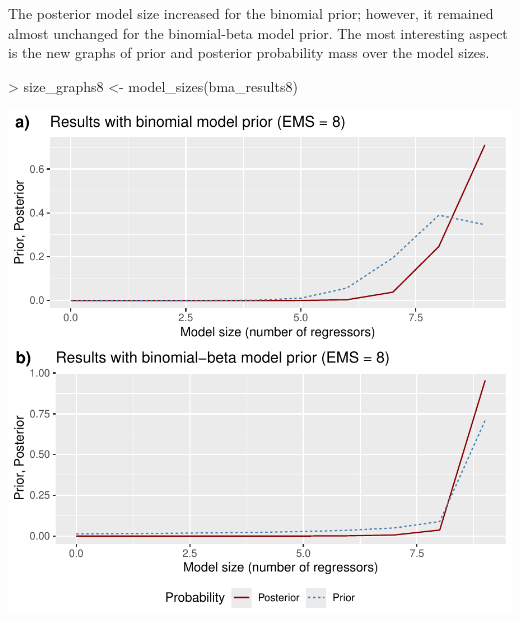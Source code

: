 \documentclass[a4paper]{article}
\begin{document}
\noindent The posterior model size increased for the binomial prior; however, it remained almost unchanged for the binomial-beta model prior.
The most interesting aspect is the new graphs of prior and posterior probability mass over the model sizes.
\begin{Schunk}
\begin{Sinput}
> size_graphs8 <- model_sizes(bma_results8)
\end{Sinput}
\end{Schunk}
\includegraphics{bdsm_vignette-034}
\end{document}
